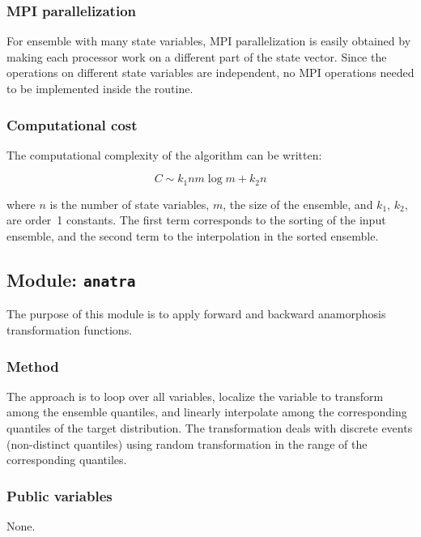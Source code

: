\documentclass[11pt]{article}
\begin{document}
\subsubsection*{MPI parallelization}

For ensemble with many state variables,
MPI parallelization is easily obtained by making each processor
work on a different part of the state vector.
Since the operations on different state variables are independent,
no MPI operations needed to be implemented inside the routine.

\subsubsection*{Computational cost}

The computational complexity of the algorithm can be written:

\begin{equation}
C \sim k_1 n  m \log m + k_2 n
\end{equation}

\noindent
where $n$ is the number of state variables,
$m$, the size of the ensemble, and
$k_1,\,k_2$, are order~1 constants.
The first term corresponds to the sorting of the input ensemble,
and the second term to the interpolation in the sorted ensemble.

\subsection{Module: {\tt\bf anatra}}

The purpose of this module is to apply forward and backward
anamorphosis transformation functions.

\subsubsection*{Method}

The approach is to loop over all variables,
localize the variable to transform among the ensemble quantiles, and
linearly interpolate among the corresponding quantiles of the target distribution.
The transformation deals with discrete events (non-distinct quantiles)
using random transformation in the range of the corresponding quantiles.

\subsubsection*{Public variables}

None.
\end{document}
